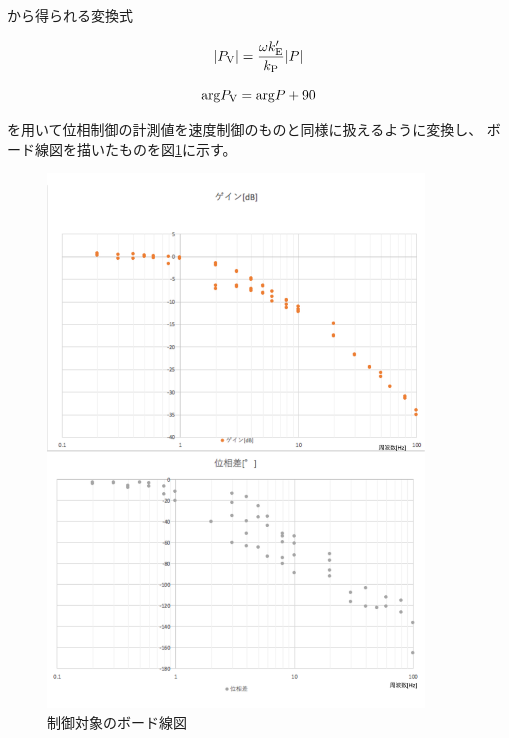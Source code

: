 \documentclass[uplatex, 11pt,a4j, titlepage]{jsarticle}
\begin{document}
から得られる変換式

\begin{equation}\label{twentyfive'}
    |P_{\rm V}| = \frac{\omega k'_{\rm E}}{k_{\rm P}}|P|
\end{equation}

\begin{equation}\label{twentyfive''}
    {\rm arg}P_{\rm V} = {\rm arg}P + 90
\end{equation}

を用いて位相制御の計測値を速度制御のものと同様に扱えるように変換し、
ボード線図を描いたものを図\ref{bode}に示す。


\begin{figure}[h]
    \centering
    \includegraphics[width=10cm]{bode.pdf}
    \caption{制御対象のボード線図}
    \label{bode}
\end{figure}
\end{document}
